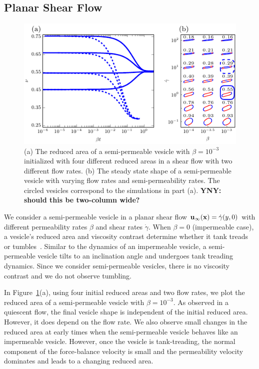 \documentclass[9pt,twocolumn,twoside,lineno]{pnas-new}
\newif\ifTikz
\begin{document}
\subsection*{Planar Shear Flow}
\begin{figure}[htp]
  \centering
  \ifTikz
  
  \else
  \includegraphics{figures/shearComposite.pdf}
  \fi
  \caption{\label{fig:shearComposite} (a) The reduced area of a
  semi-permeable vesicle with $\beta = 10^{-3}$ initialized with four
  different reduced areas in a shear flow with two different flow rates.
  (b) The steady state shape of a semi-permeable vesicle with varying
  flow rates and semi-permeability rates. The circled vesicles
  correspond to the simulations in part (a). {\bf YNY: should this be two-column wide?}}
\end{figure}

We consider a semi-permeable vesicle in a planar shear flow
$\mathbf{u}_{\infty}(\mathbf{x}) = \dot{\gamma} (y,0)$ with different permeability
rates $\beta$ and shear rates $\dot{\gamma}$. 
When $\beta=0$ (impermeable case), a vesicle's reduced area
and viscosity contrast determine whether it tank treads or
tumbles~\cite{fin-lam-sei-gom2008, kra-win-sei-lip1996}. Similar to the
dynamics of an impermeable vesicle, a semi-permeable vesicle tilts to an
inclination angle and undergoes tank treading dynamics. Since we
consider semi-permeable vesicles, there is no viscosity contrast and
we do not observe tumbling. 

In Figure~\ref{fig:shearComposite}(a), using four initial reduced areas
and two flow rates, we plot the reduced area of a semi-permeable vesicle
with $\beta = 10^{-3}$. As observed in a quiescent flow, the final
vesicle shape is independent of the initial reduced area. However, it
does depend on the flow rate. We also observe small changes in the
reduced area at early times when the semi-permeable vesicle behaves like
an impermeable vesicle. However, once the vesicle is tank-treading, the
normal component of the force-balance velocity is small and the
permeability velocity dominates and leads to a changing reduced area.
\end{document}

